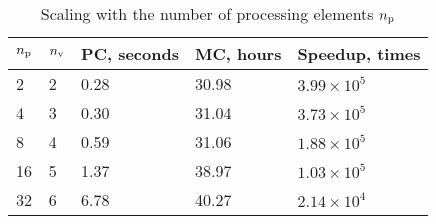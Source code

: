 \begin{table}[h]
  \vspace{-0.5em}
  \centering
  \caption{Scaling with the number of processing elements \textnormal{${n_\text{p}}$}}
  \vspace{-0.5em}
  \begin{tabular*}{1\linewidth}{L{20pt}L{15pt}R{50pt}R{50pt}R{60pt}}
    \toprule
    ${n_\text{p}}$ & ${n_\text{v}}$ & PC, seconds & MC, hours & Speedup, times \\
    \midrule
     & 2 & 0.28 & 30.98 & $3.99 \times 10^5$ \\
     4 & 3 & 0.30 & 31.04 & $3.73 \times 10^5$ \\
     8 & 4 & 0.59 & 31.06 & $1.88 \times 10^5$ \\
    16 & 5 & 1.37 & 38.97 & $1.03 \times 10^5$ \\
    32 & 6 & 6.78 & 40.27 & $2.14 \times 10^4$ \\
    \bottomrule
  \end{tabular*}
  \vspace{-0.5em}
\end{table}
